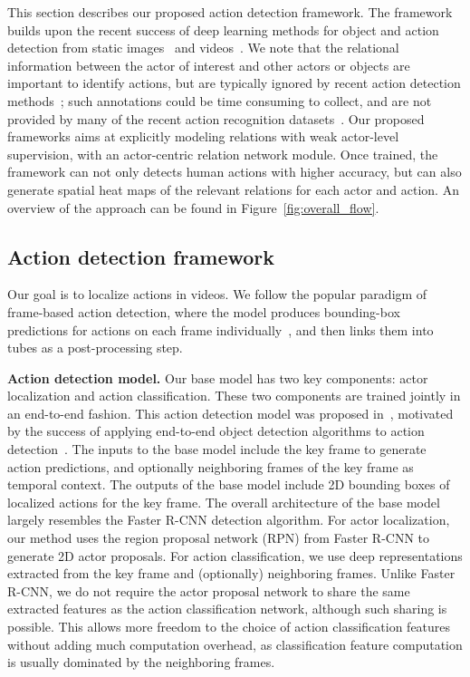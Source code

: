 \documentclass[runningheads]{llncs}
\begin{document}
This section describes our proposed action detection framework. The framework builds upon the recent success of deep learning methods for object and action detection from static images~\cite{ren2015faster} and videos~\cite{peng2016multi}. We note that the relational information between the actor of interest and other actors or objects are important to identify actions, but are typically ignored by recent action detection methods~\cite{peng2016multi,tubelets_iccv17}; such annotations could be time consuming to collect, and are not provided by many of the recent action recognition datasets~\cite{kinetics17,ava_cvpr18,charades2016}. Our proposed frameworks aims at explicitly modeling relations with weak actor-level supervision, with an actor-centric relation network module. Once trained, the framework can not only detects human actions with higher accuracy, but can also generate spatial heat maps of the relevant relations for each actor and action. An overview of the approach can be found in Figure~\ref{fig:overall_flow}.


\subsection{Action detection framework}\label{sec:framework}
Our goal is to localize actions in videos. We follow the popular paradigm of frame-based action detection, where the model produces bounding-box predictions for actions on each frame individually~\cite{peng2016multi,gkioxari2015}, and then links them into tubes as a post-processing step.

\medskip\noindent\textbf{Action detection model.} Our base model has two key components: actor localization and action classification. These two components are trained jointly in an end-to-end fashion. This action detection model was proposed in~\cite{ava_cvpr18}, motivated by the success of applying end-to-end object detection algorithms to action detection~\cite{peng2016multi,tubelets_iccv17}. The inputs to the base model include the key frame to generate action predictions, and optionally neighboring frames of the key frame as temporal context. The outputs of the base model include 2D bounding boxes of localized actions for the key frame. The overall architecture of the base model largely resembles the Faster R-CNN detection algorithm. For actor localization, our method uses the region proposal network (RPN) from Faster R-CNN to generate 2D actor proposals. For action classification, we use deep representations extracted from the key frame and (optionally) neighboring frames. Unlike Faster R-CNN, we do not require the actor proposal network to share the same extracted features as the action classification network, although such sharing is possible. This allows more freedom to the choice of action classification features without adding much computation overhead, as classification feature computation is usually dominated by the neighboring frames.
\end{document}
